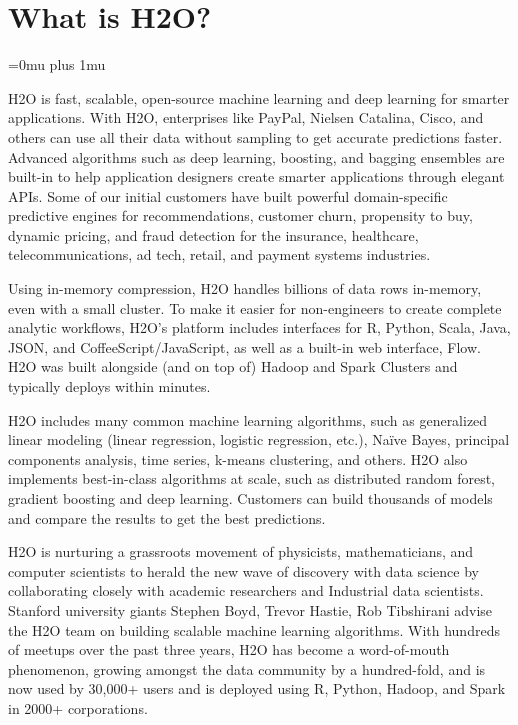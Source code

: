 \section{What is H2O?}
\Urlmuskip=0mu plus 1mu\relax %


H2O is fast, scalable, open-source machine learning and deep learning for smarter applications. With H2O, enterprises like PayPal, Nielsen Catalina, Cisco, and others can use all their data without sampling to get accurate predictions faster. Advanced algorithms such as deep learning, boosting, and bagging ensembles are built-in to help application designers create smarter applications through elegant APIs. Some of our initial customers have built powerful domain-specific predictive engines for recommendations, customer churn, propensity to buy, dynamic pricing, and fraud detection for the insurance, healthcare, telecommunications, ad tech, retail, and payment systems industries.

Using in-memory compression, H2O handles billions of data rows in-memory, even with a small cluster. To make it easier for non-engineers to create complete analytic workflows, H2O's platform includes interfaces for R, Python, Scala, Java, JSON, and CoffeeScript/JavaScript, as well as a built-in  web interface, Flow. H2O was built alongside (and on top of) Hadoop and Spark Clusters and typically deploys within minutes.

H2O includes many common machine learning algorithms, such as generalized linear modeling (linear regression, logistic regression, etc.), Na\"{i}ve Bayes, principal components analysis, time series, k-means clustering, and others. H2O also implements best-in-class algorithms at scale, such as distributed random forest, gradient boosting and deep learning. Customers can build thousands of models and compare the results to get the best predictions.

H2O is nurturing a grassroots movement of physicists, mathematicians, and computer scientists to herald the new wave of discovery with data science by collaborating closely with academic researchers and Industrial data scientists. Stanford university giants Stephen Boyd, Trevor Hastie, Rob Tibshirani advise the H2O team on building scalable machine learning algorithms. With hundreds of meetups over the past three years, H2O has become a word-of-mouth phenomenon, growing amongst the data community by a hundred-fold, and is now used by 30,000+ users and is deployed using R, Python, Hadoop, and Spark in 2000+ corporations.

